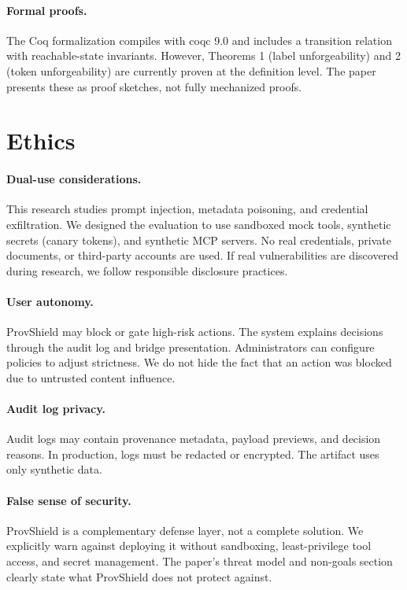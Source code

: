 \documentclass[sigconf,anonymous,review]{acmart}
\begin{document}
\paragraph{Formal proofs.} The Coq formalization compiles with coqc 9.0 and includes a transition relation with reachable-state invariants. However, Theorems 1 (label unforgeability) and 2 (token unforgeability) are currently proven at the definition level. The paper presents these as proof sketches, not fully mechanized proofs.
\section{Ethics}
\label{sec:ethics}

\paragraph{Dual-use considerations.} This research studies prompt injection, metadata poisoning, and credential exfiltration. We designed the evaluation to use sandboxed mock tools, synthetic secrets (canary tokens), and synthetic MCP servers. No real credentials, private documents, or third-party accounts are used. If real vulnerabilities are discovered during research, we follow responsible disclosure practices.
\paragraph{User autonomy.} ProvShield may block or gate high-risk actions. The system explains decisions through the audit log and bridge presentation. Administrators can configure policies to adjust strictness. We do not hide the fact that an action was blocked due to untrusted content influence.

\paragraph{Audit log privacy.} Audit logs may contain provenance metadata, payload previews, and decision reasons. In production, logs must be redacted or encrypted. The artifact uses only synthetic data.

\paragraph{False sense of security.} ProvShield is a complementary defense layer, not a complete solution. We explicitly warn against deploying it without sandboxing, least-privilege tool access, and secret management. The paper's threat model and non-goals section clearly state what ProvShield does not protect against.
\end{document}
